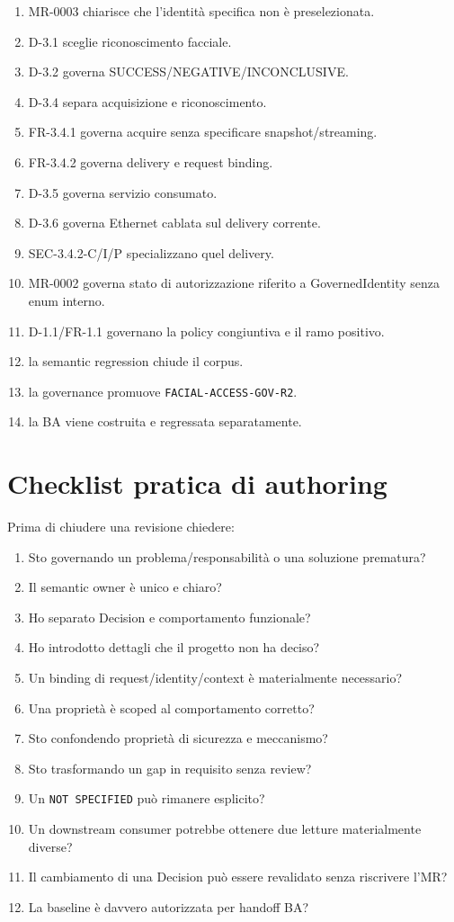 \documentclass[11pt,a4paper]{article}
\newcommand{\code}[1]{\nolinkurl{#1}}
\begin{document}
\begin{enumerate}
\item MR-0003 chiarisce che l'identità specifica non è preselezionata.
\item D-3.1 sceglie riconoscimento facciale.
\item D-3.2 governa SUCCESS/NEGATIVE/INCONCLUSIVE.
\item D-3.4 separa acquisizione e riconoscimento.
\item FR-3.4.1 governa acquire senza specificare snapshot/streaming.
\item FR-3.4.2 governa delivery e request binding.
\item D-3.5 governa servizio consumato.
\item D-3.6 governa Ethernet cablata sul delivery corrente.
\item SEC-3.4.2-C/I/P specializzano quel delivery.
\item MR-0002 governa stato di autorizzazione riferito a GovernedIdentity senza enum interno.
\item D-1.1/FR-1.1 governano la policy congiuntiva e il ramo positivo.
\item la semantic regression chiude il corpus.
\item la governance promuove \code{FACIAL-ACCESS-GOV-R2}.
\item la BA viene costruita e regressata separatamente.
\end{enumerate}

\section{Checklist pratica di authoring}

Prima di chiudere una revisione chiedere:

\begin{enumerate}
\item Sto governando un problema/responsabilità o una soluzione prematura?
\item Il semantic owner è unico e chiaro?
\item Ho separato Decision e comportamento funzionale?
\item Ho introdotto dettagli che il progetto non ha deciso?
\item Un binding di request/identity/context è materialmente necessario?
\item Una proprietà è scoped al comportamento corretto?
\item Sto confondendo proprietà di sicurezza e meccanismo?
\item Sto trasformando un gap in requisito senza review?
\item Un \code{NOT SPECIFIED} può rimanere esplicito?
\item Un downstream consumer potrebbe ottenere due letture materialmente diverse?
\item Il cambiamento di una Decision può essere revalidato senza riscrivere l'MR?
\item La baseline è davvero autorizzata per handoff BA?
\end{enumerate}
\end{document}
